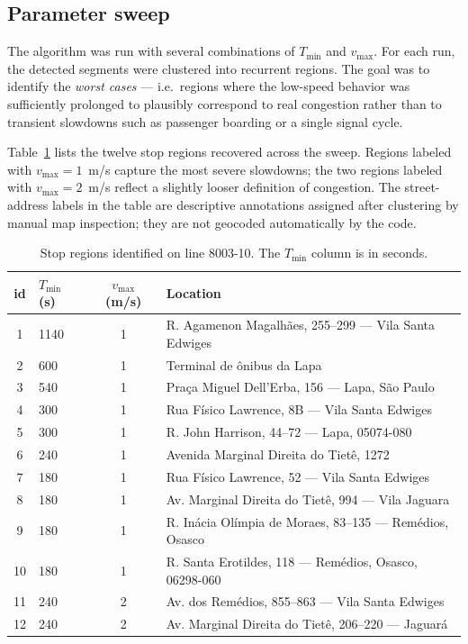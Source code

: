 \documentclass[11pt,a4paper]{article}
\begin{document}
\subsection{Parameter sweep}

The algorithm was run with several combinations of $T_{\min}$ and
$v_{\max}$. For each run, the detected segments were clustered into
recurrent regions. The goal was to identify the \emph{worst cases} —
i.e.\ regions where the low-speed behavior was sufficiently prolonged to
plausibly correspond to real congestion rather than to transient
slowdowns such as passenger boarding or a single signal cycle.

Table~\ref{tab:stops} lists the twelve stop regions recovered across
the sweep. Regions labeled with $v_{\max}=1$~m/s capture the most
severe slowdowns; the two regions labeled with $v_{\max}=2$~m/s reflect
a slightly looser definition of congestion. The street-address labels in
the table are descriptive annotations assigned after clustering by
manual map inspection; they are not geocoded automatically by the code.

\begin{table}[t]
    \centering
    \caption{Stop regions identified on line 8003-10. The $T_{\min}$
    column is in seconds.}
    \label{tab:stops}
    \begin{tabular}{@{}clcl@{}}
        \toprule
        id & $T_{\min}$ (s) & $v_{\max}$ (m/s) & Location \\
        \midrule
        1  & 1140 & 1 & R. Agamenon Magalhães, 255--299 — Vila Santa Edwiges \\
        2  &  600 & 1 & Terminal de ônibus da Lapa \\
        3  &  540 & 1 & Praça Miguel Dell'Erba, 156 — Lapa, São Paulo \\
        4  &  300 & 1 & Rua Físico Lawrence, 8B — Vila Santa Edwiges \\
        5  &  300 & 1 & R. John Harrison, 44--72 — Lapa, 05074-080 \\
        6  &  240 & 1 & Avenida Marginal Direita do Tietê, 1272 \\
        7  &  180 & 1 & Rua Físico Lawrence, 52 — Vila Santa Edwiges \\
        8  &  180 & 1 & Av. Marginal Direita do Tietê, 994 — Vila Jaguara \\
        9  &  180 & 1 & R. Inácia Olímpia de Moraes, 83--135 — Remédios, Osasco \\
        10 &  180 & 1 & R. Santa Erotildes, 118 — Remédios, Osasco, 06298-060 \\
        11 &  240 & 2 & Av. dos Remédios, 855--863 — Vila Santa Edwiges \\
        12 &  240 & 2 & Av. Marginal Direita do Tietê, 206--220 — Jaguará \\
        \bottomrule
    \end{tabular}
\end{table}
\end{document}
